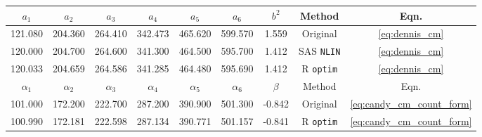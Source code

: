 
\begin{tabular}{ccccccccc}
\toprule
$a_1$ & $a_2$ & $a_3$ & $a_4$ & $a_5$ & $a_6$ & $b^2$ & Method & Eqn.\\
\midrule
121.080 & 204.360 & 264.410 & 342.473 & 465.620 & 599.570 & 1.559 & Original \citep{kemp1986stochastic} & \ref{eq:dennis_cm}\\
120.000 & 204.700 & 264.600 & 341.300 & 464.500 & 595.700 & 1.412 & SAS \verb+NLIN+ & \ref{eq:dennis_cm}\\
120.033 & 204.659 & 264.586 & 341.285 & 464.480 & 595.690 & 1.412 & R \verb+optim+ & \ref{eq:dennis_cm}\\
\midrule $\alpha_1$ & $\alpha_2$ & $\alpha_3$ & $\alpha_4$ & $\alpha_5$ & $\alpha_6$ & $\beta$ & Method & Eqn. \\ \midrule
101.000 & 172.200 & 222.700 & 287.200 & 390.900 & 501.300 & -0.842 & Original \citep{candy1991modeling} & \ref{eq:candy_cm_count_form}\\
100.990 & 172.181 & 222.598 & 287.134 & 390.771 & 501.157 & -0.841 & R \verb+optim+ & \ref{eq:candy_cm_count_form}\\
\bottomrule
\end{tabular}